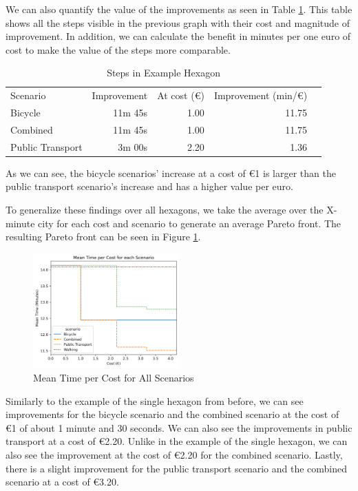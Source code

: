 We can also quantify the value of the improvements as seen in Table \ref{tab:differences_in_example_hexagon}.
This table shows all the steps visible in the previous graph with their cost and magnitude of improvement.
In addition, we can calculate the benefit in minutes per one euro of cost to make the value of the steps more comparable.
\begin{table}
  \caption{Steps in Example Hexagon}
  \label{tab:differences_in_example_hexagon}
  \begin{center}
    \begin{tabular}{lrrrl}
     Scenario & Improvement & At cost (\euro) & Improvement (min/\euro) \\
     Bicycle & 11m 45s & 1.00 & 11.75 \\
     Combined & 11m 45s & 1.00 & 11.75 \\
     Public Transport & 3m 00s & 2.20 & 1.36 \\
    \end{tabular}
  \end{center}
\end{table}
As we can see, the bicycle scenarios' increase at a cost of \euro{1} is larger than the public transport scenario's increase and has a higher value per euro.

To generalize these findings over all hexagons, we take the average over the X-minute city for each cost and scenario to generate an average Pareto front.
The resulting Pareto front can be seen in Figure \ref{fig:mean_time_per_cost}.
\begin{figure}
  \begin{center}
     \includegraphics[width=0.5\textwidth]{Figures/results/metric_cost/mean_time_per_cost}
  \end{center}
  \caption{Mean Time per Cost for All Scenarios}
  \label{fig:mean_time_per_cost}
\end{figure}
Similarly to the example of the single hexagon from before, we can see improvements for the bicycle scenario and the combined scenario at the cost of \euro{1} of about 1 minute and 30 seconds.
We can also see the improvements in public transport at a cost of \euro{2.20}.
Unlike in the example of the single hexagon, we can also see the improvement at the cost of \euro{2.20} for the combined scenario.
Lastly, there is a slight improvement for the public transport scenario and the combined scenario at a cost of \euro{3.20}.

